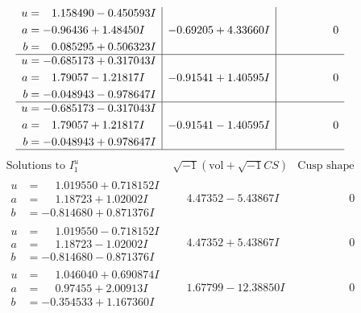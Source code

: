 \documentclass[1p]{elsarticle_modified}
\theoremstyle{definition}
\newcommand{\I}{\sqrt{-1}}
\begin{document}
$$\begin{array}{c|c|c}
\begin{aligned}
u &= \phantom{-}1.158490 - 0.450593 I \\
a &= -0.96436 + 1.48450 I \\
b &= \phantom{-}0.085295 + 0.506323 I\end{aligned}
 & -0.69205 + 4.33660 I & \phantom{-0.000000 } 0 \\ \hline\begin{aligned}
u &= -0.685173 + 0.317043 I \\
a &= \phantom{-}1.79057 - 1.21817 I \\
b &= -0.048943 - 0.978647 I\end{aligned}
 & -0.91541 + 1.40595 I & \phantom{-0.000000 } 0 \\ \hline\begin{aligned}
u &= -0.685173 - 0.317043 I \\
a &= \phantom{-}1.79057 + 1.21817 I \\
b &= -0.048943 + 0.978647 I\end{aligned}
 & -0.91541 - 1.40595 I & \phantom{-0.000000 } 0\\
 \hline 
 \end{array}$$\newpage$$\begin{array}{c|c|c}  
\text{Solutions to }I^u_{1}& \I (\text{vol} + \sqrt{-1}CS) & \text{Cusp shape}\\
 \hline 
\begin{aligned}
u &= \phantom{-}1.019550 + 0.718152 I \\
a &= \phantom{-}1.18723 + 1.02002 I \\
b &= -0.814680 + 0.871376 I\end{aligned}
 & \phantom{-}4.47352 - 5.43867 I & \phantom{-0.000000 } 0 \\ \hline\begin{aligned}
u &= \phantom{-}1.019550 - 0.718152 I \\
a &= \phantom{-}1.18723 - 1.02002 I \\
b &= -0.814680 - 0.871376 I\end{aligned}
 & \phantom{-}4.47352 + 5.43867 I & \phantom{-0.000000 } 0 \\ \hline\begin{aligned}
u &= \phantom{-}1.046040 + 0.690874 I \\
a &= \phantom{-}0.97455 + 2.00913 I \\
b &= -0.354533 + 1.167360 I\end{aligned}
 & \phantom{-}1.67799 - 12.38850 I & \phantom{-0.000000 } 0 \\ \hline\begin{aligned}

\end{aligned}
\end{array}$$
\end{document}
